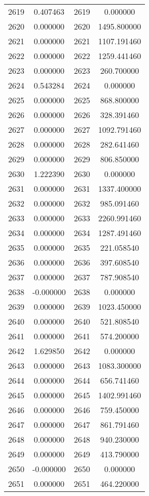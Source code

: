\documentclass[12pt]{article}
\begin{document}
\begin{longtable}{@{}cccc@{}}
2619 & 0.407463 & 2619 & 0.000000 \\
2620 & 0.000000 & 2620 & 1495.800000 \\
2621 & 0.000000 & 2621 & 1107.191460 \\
2622 & 0.000000 & 2622 & 1259.441460 \\
2623 & 0.000000 & 2623 & 260.700000 \\
2624 & 0.543284 & 2624 & 0.000000 \\
2625 & 0.000000 & 2625 & 868.800000 \\
2626 & 0.000000 & 2626 & 328.391460 \\
2627 & 0.000000 & 2627 & 1092.791460 \\
2628 & 0.000000 & 2628 & 282.641460 \\
2629 & 0.000000 & 2629 & 806.850000 \\
2630 & 1.222390 & 2630 & 0.000000 \\
2631 & 0.000000 & 2631 & 1337.400000 \\
2632 & 0.000000 & 2632 & 985.091460 \\
2633 & 0.000000 & 2633 & 2260.991460 \\
2634 & 0.000000 & 2634 & 1287.491460 \\
2635 & 0.000000 & 2635 & 221.058540 \\
2636 & 0.000000 & 2636 & 397.608540 \\
2637 & 0.000000 & 2637 & 787.908540 \\
2638 & -0.000000 & 2638 & 0.000000 \\
2639 & 0.000000 & 2639 & 1023.450000 \\
2640 & 0.000000 & 2640 & 521.808540 \\
2641 & 0.000000 & 2641 & 574.200000 \\
2642 & 1.629850 & 2642 & 0.000000 \\
2643 & 0.000000 & 2643 & 1083.300000 \\
2644 & 0.000000 & 2644 & 656.741460 \\
2645 & 0.000000 & 2645 & 1402.991460 \\
2646 & 0.000000 & 2646 & 759.450000 \\
2647 & 0.000000 & 2647 & 861.791460 \\
2648 & 0.000000 & 2648 & 940.230000 \\
2649 & 0.000000 & 2649 & 413.790000 \\
2650 & -0.000000 & 2650 & 0.000000 \\
2651 & 0.000000 & 2651 & 464.220000 \\

\end{longtable}
\end{document}
